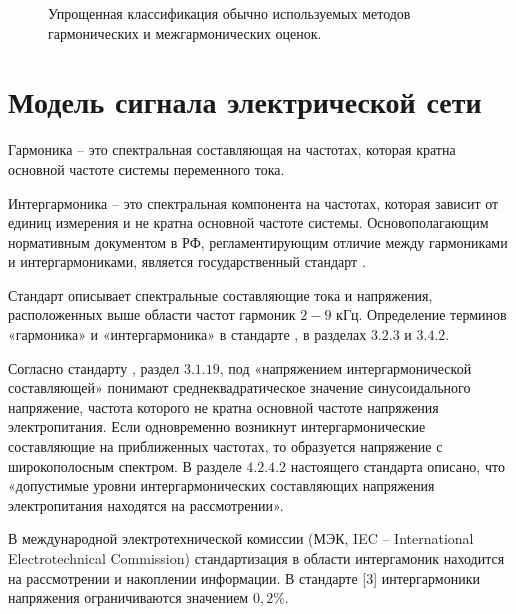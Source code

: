 \begin{figure}[ht]
	\caption{Упрощенная классификация обычно используемых методов гармонических и межгармонических оценок.}\label{fig:picture1.3}
\end{figure}

\section{Модель сигнала электрической сети} \label{sec:ch1/sec2}

Гармоника -- это спектральная составляющая на частотах, которая кратна основной частоте системы переменного тока. 

Интергармоника -- это спектральная компонента на частотах, которая зависит от единиц измерения и не кратна основной частоте системы.
Основополагающим нормативным документом в РФ, регламентирующим отличие между гармониками и интергармониками, является государственный стандарт \cite{GOST30804.4.7-2013}. 

Стандарт  описывает спектральные составляющие тока и напряжения, расположенных выше области частот гармоник $2-9$ кГц. Определение терминов «гармоника» и «интергармоника» в стандарте \cite{GOST30804.4.7-2013}, в разделах $3.2.3$ и $3.4.2$.

Согласно стандарту \cite{GOST32144-2013}, раздел $3.1.19$, под «напряжением интергармонической составляющей» понимают среднеквадратическое значение синусоидального напряжение, частота которого не кратна основной частоте напряжения электропитания.
Если одновременно возникнут интергармонические составляющие на приближенных частотах, то образуется напряжение с широкополосным спектром. В разделе $4.2.4.2$ настоящего стандарта описано, что «допустимые уровни интергармонических составляющих напряжения электропитания находятся на рассмотрении».

В международной электротехнической комиссии (МЭК, IEC -- International Electrotechnical Commission) стандартизация в области интергамоник находится на рассмотрении и накоплении информации. В стандарте [3] интергармоники напряжения ограничиваются значением $0,2\%$.

